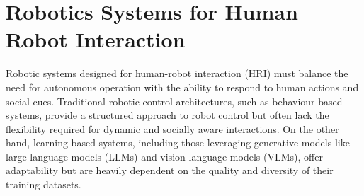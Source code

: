 \section{Robotics Systems for Human Robot Interaction}
\label{sec::LiteratureReview::RobotControlHRI}

Robotic systems designed for human-robot interaction (HRI) must balance the need for autonomous operation with the ability to respond to human actions and social cues. Traditional robotic control architectures, such as behaviour-based systems, provide a structured approach to robot control but often lack the flexibility required for dynamic and socially aware interactions. On the other hand, learning-based systems, including those leveraging generative models like large language models (LLMs) and vision-language models (VLMs), offer adaptability but are heavily dependent on the quality and diversity of their training datasets.